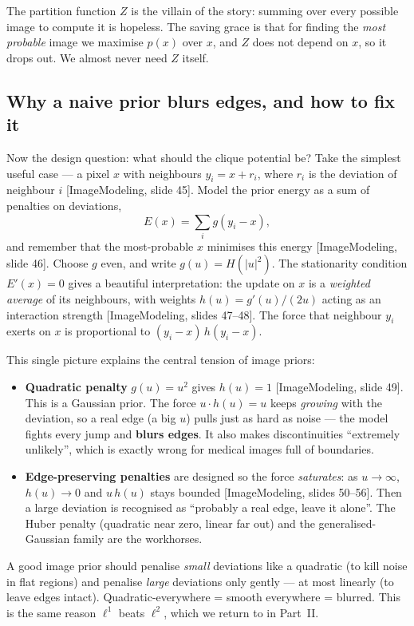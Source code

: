 \documentclass[11pt]{article}
\newcommand{\deck}[1]{\textsf{\small[#1]}}
\begin{document}
The partition function $Z$ is the villain of the story: summing over every
possible image to compute it is hopeless. The saving grace is that for finding
the \emph{most probable} image we maximise $p(x)$ over $x$, and $Z$ does not
depend on $x$, so it drops out. We almost never need $Z$ itself.

\subsection{Why a naive prior blurs edges, and how to fix it}

Now the design question: what should the clique potential be? Take the simplest
useful case --- a pixel $x$ with neighbours $y_i = x + r_i$, where $r_i$ is the
deviation of neighbour $i$ \deck{ImageModeling, slide 45}. Model the prior
energy as a sum of penalties on deviations,
\[
E(x) = \sum_i g(y_i - x),
\]
and remember that the most-probable $x$ minimises this energy
\deck{ImageModeling, slide 46}. Choose $g$ even, and write $g(u)=H(|u|^2)$. The
stationarity condition $E'(x)=0$ gives a beautiful interpretation: the update
on $x$ is a \emph{weighted average} of its neighbours, with weights
$h(u) = g'(u)/(2u)$ acting as an interaction strength \deck{ImageModeling,
slides 47--48}. The force that neighbour $y_i$ exerts on $x$ is proportional to
$(y_i-x)\,h(y_i-x)$.

This single picture explains the central tension of image priors:

\begin{itemize}[nosep,leftmargin=*]
  \item \textbf{Quadratic penalty} $g(u)=u^2$ gives $h(u)=1$
  \deck{ImageModeling, slide 49}. This is a Gaussian prior. The force
  $u\cdot h(u)=u$ keeps \emph{growing} with the deviation, so a real edge (a
  big $u$) pulls just as hard as noise --- the model fights every jump and
  \textbf{blurs edges}. It also makes discontinuities ``extremely unlikely'',
  which is exactly wrong for medical images full of boundaries.
  \item \textbf{Edge-preserving penalties} are designed so the force
  \emph{saturates}: as $u\to\infty$, $h(u)\to 0$ and $u\,h(u)$ stays bounded
  \deck{ImageModeling, slides 50--56}. Then a large deviation is recognised as
  ``probably a real edge, leave it alone''. The Huber penalty (quadratic near
  zero, linear far out) and the generalised-Gaussian family are the workhorses.
\end{itemize}

\begin{keybox}
A good image prior should penalise \emph{small} deviations like a quadratic (to
kill noise in flat regions) and penalise \emph{large} deviations only gently
--- at most linearly (to leave edges intact). Quadratic-everywhere = smooth
everywhere = blurred. This is the same reason $\ell^1$ beats $\ell^2$, which we
return to in Part~II.
\end{keybox}
\end{document}
